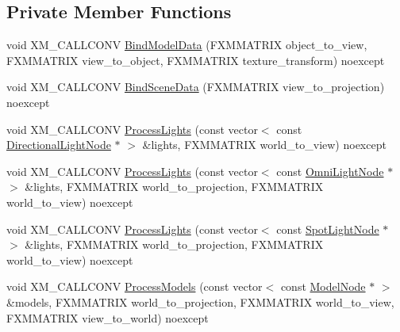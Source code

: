 \subsection*{Private Member Functions}
\begin{DoxyCompactItemize}
\item 
void X\+M\+\_\+\+C\+A\+L\+L\+C\+O\+NV \hyperlink{classmage_1_1_constant_shading_pass_a3a7137609e3b949735556458d2cd803d}{Bind\+Model\+Data} (F\+X\+M\+M\+A\+T\+R\+IX object\+\_\+to\+\_\+view, F\+X\+M\+M\+A\+T\+R\+IX view\+\_\+to\+\_\+object, F\+X\+M\+M\+A\+T\+R\+IX texture\+\_\+transform) noexcept
\item 
void X\+M\+\_\+\+C\+A\+L\+L\+C\+O\+NV \hyperlink{classmage_1_1_constant_shading_pass_a26af4a4f340be3b4c153c81a571aae8c}{Bind\+Scene\+Data} (F\+X\+M\+M\+A\+T\+R\+IX view\+\_\+to\+\_\+projection) noexcept
\item 
void X\+M\+\_\+\+C\+A\+L\+L\+C\+O\+NV \hyperlink{classmage_1_1_constant_shading_pass_a948d1258f9bafad1be72765f8021b4ca}{Process\+Lights} (const vector$<$ const \hyperlink{namespacemage_a7637b5351fc0f66a10badd80ebb35899}{Directional\+Light\+Node} $\ast$ $>$ \&lights, F\+X\+M\+M\+A\+T\+R\+IX world\+\_\+to\+\_\+view) noexcept
\item 
void X\+M\+\_\+\+C\+A\+L\+L\+C\+O\+NV \hyperlink{classmage_1_1_constant_shading_pass_a61dad88b377d045e2757606f911a7d47}{Process\+Lights} (const vector$<$ const \hyperlink{namespacemage_a1724c6e6b6b5ba535cdd967cbbb4a669}{Omni\+Light\+Node} $\ast$ $>$ \&lights, F\+X\+M\+M\+A\+T\+R\+IX world\+\_\+to\+\_\+projection, F\+X\+M\+M\+A\+T\+R\+IX world\+\_\+to\+\_\+view) noexcept
\item 
void X\+M\+\_\+\+C\+A\+L\+L\+C\+O\+NV \hyperlink{classmage_1_1_constant_shading_pass_a43b925392237991e2492f23dd35f3457}{Process\+Lights} (const vector$<$ const \hyperlink{namespacemage_aeed5dee4ff6c591eabb0e9114256df4a}{Spot\+Light\+Node} $\ast$ $>$ \&lights, F\+X\+M\+M\+A\+T\+R\+IX world\+\_\+to\+\_\+projection, F\+X\+M\+M\+A\+T\+R\+IX world\+\_\+to\+\_\+view) noexcept
\item 
void X\+M\+\_\+\+C\+A\+L\+L\+C\+O\+NV \hyperlink{classmage_1_1_constant_shading_pass_a74efecf100ea18251d9e5acde63dd242}{Process\+Models} (const vector$<$ const \hyperlink{classmage_1_1_model_node}{Model\+Node} $\ast$ $>$ \&models, F\+X\+M\+M\+A\+T\+R\+IX world\+\_\+to\+\_\+projection, F\+X\+M\+M\+A\+T\+R\+IX world\+\_\+to\+\_\+view, F\+X\+M\+M\+A\+T\+R\+IX view\+\_\+to\+\_\+world) noexcept
\end{DoxyCompactItemize}
